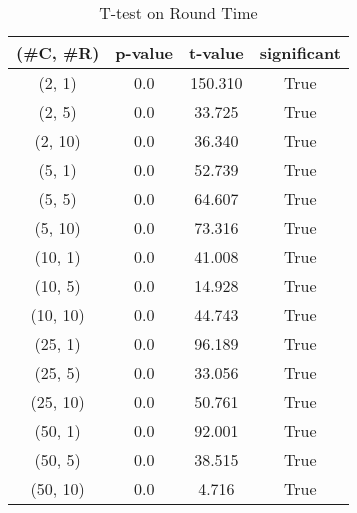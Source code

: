 \begin{table}[h]
\centering
\caption{T-test on Round Time}
\label{tab:t-testRound}
\begin{tabular}{|c|c|c|c|}
\toprule
(\#C, \#R) &  p-value &  t-value &  significant \\
\midrule
  (2, 1) &      0.0 &  150.310 &         True \\
  (2, 5) &      0.0 &   33.725 &         True \\
 (2, 10) &      0.0 &   36.340 &         True \\
  (5, 1) &      0.0 &   52.739 &         True \\
  (5, 5) &      0.0 &   64.607 &         True \\
 (5, 10) &      0.0 &   73.316 &         True \\
 (10, 1) &      0.0 &   41.008 &         True \\
 (10, 5) &      0.0 &   14.928 &         True \\
(10, 10) &      0.0 &   44.743 &         True \\
 (25, 1) &      0.0 &   96.189 &         True \\
 (25, 5) &      0.0 &   33.056 &         True \\
(25, 10) &      0.0 &   50.761 &         True \\
 (50, 1) &      0.0 &   92.001 &         True \\
 (50, 5) &      0.0 &   38.515 &         True \\
(50, 10) &      0.0 &    4.716 &         True \\
\bottomrule
\end{tabular}
\end{table}
